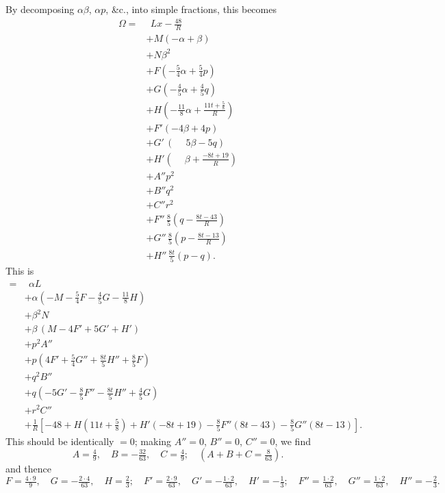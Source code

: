 \documentclass[11pt,a4paper]{article}
\begin{document}
By decomposing $\alpha \beta$, $\alpha p$, \&c., into simple fractions, this becomes
\begin{align*}
\Omega = &\ \ Lx - \frac{48}{R}\\
&+ M(- \alpha + \beta)\\
&+ N \beta^2\\
&+ F(- \tfrac{5}{4} \alpha + \tfrac{5}{4} p)\\
&+ G(- \tfrac{4}{5} \alpha + \tfrac{4}{5} q)\\
&+ H\!\left(- \tfrac{11}{8} \alpha + \frac{11 t + \tfrac{5}{8}}{R}\right)\\
&+ F'(- 4 \beta + 4 p)\\
&+ G'\,(\phantom{-}5 \beta - 5 q)\\
&+ H'\!\left(\phantom{-}\beta + \frac{- 8 t + 19}{R}\right)\\
&+ A'' p^2\\
&+ B'' q^2\\
&+ C'' r^2\\
&+ F''\,\tfrac{8}{5}\!\left(q - \frac{8 t - 43}{R}\right)\\
&+ G''\,\tfrac{8}{5}\!\left(p - \frac{8 t - 13}{R}\right)\\
&+ H''\,\tfrac{8 t}{5} (p - q).
\end{align*}
This is
\begin{align*}
= &\ \ \alpha L\\
&+ \alpha(- M - \tfrac{5}{4} F - \tfrac{4}{5} G - \tfrac{11}{8} H)\\
&+ \beta^2 N\\
&+ \beta\,(M - 4 F' + 5 G' + H')\\
&+ p^2 A''\\
&+ p(4 F' + \tfrac{5}{4} G'' + \tfrac{8 t}{5} H'' + \tfrac{8}{5} F)\\
&+ q^2 B''\\
&+ q(- 5 G' - \tfrac{8}{5} F'' - \tfrac{8 t}{5} H'' + \tfrac{4}{5} G)\\
&+ r^2 C''\\
&+ \frac{1}{R}\!\left[- 48 + H(11 t + \tfrac{5}{8}) + H'(- 8 t + 19) - \tfrac{8}{5} F''(8 t - 43) - \tfrac{8}{5} G''(8 t - 13)\right].
\end{align*}
This should be identically $= 0$; making $A'' = 0$, $B'' = 0$, $C'' = 0$, we find
\[
A = \tfrac{4}{9},\quad B = - \tfrac{32}{63},\quad C = \tfrac{4}{9};\quad (A + B + C = \tfrac{8}{63}).
\]
and thence
\[
F = \tfrac{4 \cdot 9}{9},\quad G = - \tfrac{2 \cdot 4}{63},\quad H = \tfrac{2}{3};\quad F' = \tfrac{2 \cdot 9}{63},\quad G' = - \tfrac{1 \cdot 2}{63},\quad H' = - \tfrac{1}{3};\quad F'' = \tfrac{1 \cdot 2}{63},\quad G'' = \tfrac{1 \cdot 2}{63},\quad H'' = - \tfrac{2}{3}.
\]
\end{document}
